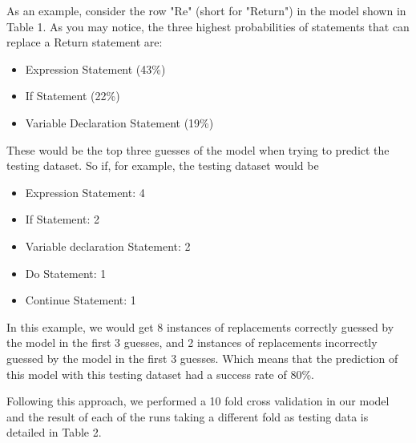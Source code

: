 \documentclass{sig-alternate-05-2015}
\begin{document}
As an example, consider the row "Re" (short for "Return") in the model shown in Table 1. As you may notice, the three highest probabilities of statements that can replace a Return statement are:
\begin{itemize}
  \item Expression Statement (43\%)
  \item If Statement (22\%)
  \item Variable Declaration Statement (19\%)
\end{itemize}
These would be the top three guesses of the model when trying to predict the testing dataset.
So if, for example, the testing dataset would be
\begin{itemize}
  \color{ForestGreen}  
  \item Expression Statement: 4
  \item If Statement: 2
  \item Variable declaration Statement: 2
    \color{red}  
  \item Do Statement: 1
  \item Continue Statement: 1
\end{itemize}

In this example, we would get 8 instances of replacements correctly guessed by the model in the first 3 guesses, and 2 instances of replacements incorrectly guessed by the model in the first 3 guesses. Which means that the prediction of this model with this testing dataset had a success rate of 80\%.

Following this approach, we performed a 10 fold cross validation in our model and the result of each of the runs taking a different fold as testing data is detailed in Table 2.


\begin{table*}
	\centering
		\caption{10 Fold cross validation of the probabilistic model}\label{tab:likeliness}
\end{table*}
\end{document}
